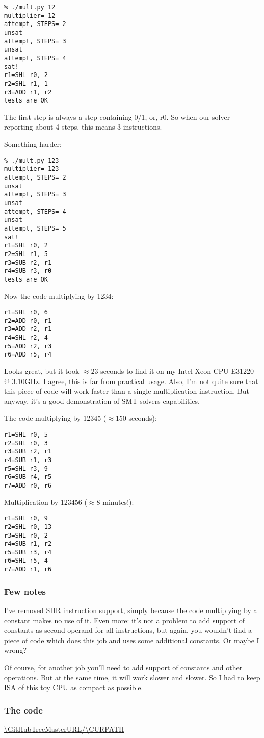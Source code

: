 \begin{lstlisting}
% ./mult.py 12
multiplier= 12
attempt, STEPS= 2
unsat
attempt, STEPS= 3
unsat
attempt, STEPS= 4
sat!
r1=SHL r0, 2
r2=SHL r1, 1
r3=ADD r1, r2
tests are OK
\end{lstlisting}

The first step is always a step containing 0/1, or, r0.
So when our solver reporting about 4 steps, this means 3 instructions.

Something harder:

\begin{lstlisting}
% ./mult.py 123
multiplier= 123
attempt, STEPS= 2
unsat
attempt, STEPS= 3
unsat
attempt, STEPS= 4
unsat
attempt, STEPS= 5
sat!
r1=SHL r0, 2
r2=SHL r1, 5
r3=SUB r2, r1
r4=SUB r3, r0
tests are OK
\end{lstlisting}

Now the code multiplying by 1234:

\begin{lstlisting}
r1=SHL r0, 6
r2=ADD r0, r1
r3=ADD r2, r1
r4=SHL r2, 4
r5=ADD r2, r3
r6=ADD r5, r4
\end{lstlisting}

Looks great, but it took $\approx 23$ seconds to find it on my Intel Xeon CPU E31220 @ 3.10GHz.
I agree, this is far from practical usage.
Also, I'm not quite sure that this piece of code will work faster than a single multiplication instruction.
But anyway, it's a good demonstration of SMT solvers capabilities.

The code multiplying by 12345 ($\approx 150$ seconds):

\begin{lstlisting}
r1=SHL r0, 5
r2=SHL r0, 3
r3=SUB r2, r1
r4=SUB r1, r3
r5=SHL r3, 9
r6=SUB r4, r5
r7=ADD r0, r6
\end{lstlisting}

Multiplication by 123456 ($\approx 8$ minutes!):

\begin{lstlisting}
r1=SHL r0, 9
r2=SHL r0, 13
r3=SHL r0, 2
r4=SUB r1, r2
r5=SUB r3, r4
r6=SHL r5, 4
r7=ADD r1, r6
\end{lstlisting}

\subsubsection{Few notes}

I've removed SHR instruction support, simply because the code multiplying by a constant makes no use of it.
Even more: it's not a problem to add support of constants as second operand for all instructions,
but again, you wouldn't find a piece of code which does this job and uses some additional constants.
Or maybe I wrong?

Of course, for another job you'll need to add support of constants and other operations.
But at the same time, it will work slower and slower.
So I had to keep \ac{ISA} of this toy \ac{CPU} as compact as possible.

\subsubsection{The code}

\url{\GitHubTreeMasterURL/\CURPATH}

